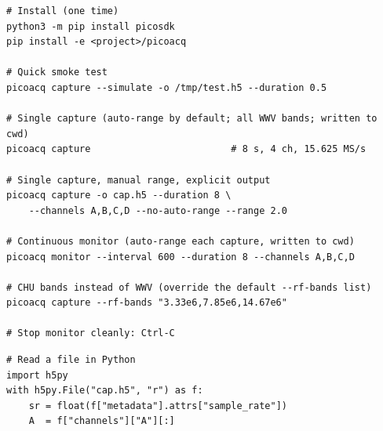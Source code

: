 \documentclass[11pt]{article}
\begin{document}
\begin{lstlisting}[style=shell]
# Install (one time)
python3 -m pip install picosdk
pip install -e <project>/picoacq

# Quick smoke test
picoacq capture --simulate -o /tmp/test.h5 --duration 0.5

# Single capture (auto-range by default; all WWV bands; written to cwd)
picoacq capture                         # 8 s, 4 ch, 15.625 MS/s

# Single capture, manual range, explicit output
picoacq capture -o cap.h5 --duration 8 \
    --channels A,B,C,D --no-auto-range --range 2.0

# Continuous monitor (auto-range each capture, written to cwd)
picoacq monitor --interval 600 --duration 8 --channels A,B,C,D

# CHU bands instead of WWV (override the default --rf-bands list)
picoacq capture --rf-bands "3.33e6,7.85e6,14.67e6"

# Stop monitor cleanly: Ctrl-C
\end{lstlisting}

\begin{lstlisting}[style=py]
# Read a file in Python
import h5py
with h5py.File("cap.h5", "r") as f:
    sr = float(f["metadata"].attrs["sample_rate"])
    A  = f["channels"]["A"][:]
\end{lstlisting}
\end{document}
